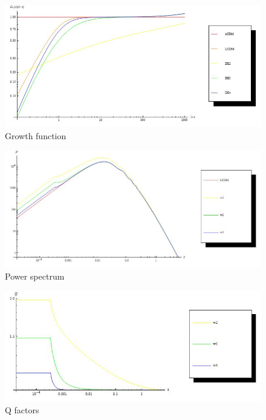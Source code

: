 \documentclass{article}
\begin{document}
\begin{figure}[!htbp]
\centering
\includegraphics[width=400pt]{DEs_GrowtheFunction_Sync2.jpg}
\caption{Growth function}\label{fig:GrowthFunction_Sync2}
\end{figure}








\begin{figure}[!htbp]
\centering
\includegraphics[width=400pt]{DEs_PowerSpectrum_Sync.jpg}
\caption{Power spectrum}\label{fig:PowerSpectrum_Sync}
\end{figure}



\begin{figure}[!htbp]
\centering
\includegraphics[width=400pt]{DEs_Q_Sync.jpg}
\caption{Q factors}\label{fig:DE_Qfac_Sync}
\end{figure}



















\end{document}

